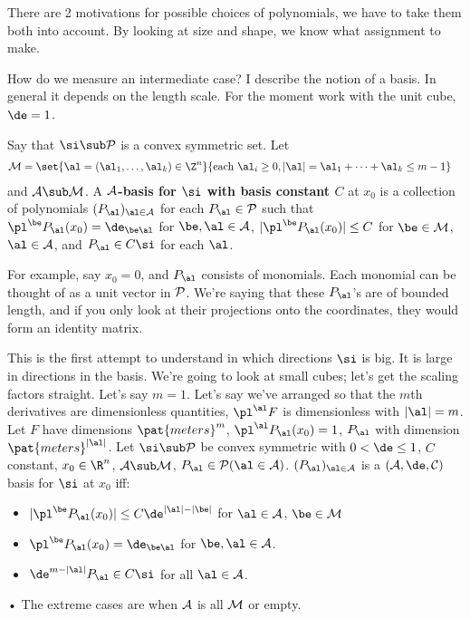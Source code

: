 There are 2 motivations for possible choices of polynomials, we have to take them both into account. By looking at size and shape, we know what assignment to make.

How do we measure an intermediate case? I describe the notion of a basis. In general it depends on the length scale. For the moment work with the unit cube, $\de=1$. 
\begin{df}
Say that $\si\sub \cal P$ is a convex symmetric set. Let
\begin{align}
\cal M&=\set{\al=(\al_1,\ldots, \al_k)\in \Z^n}{\text{each }\al_i\ge 0, |\al|=\al_1+\cdots +\al_k\le m-1}
\end{align}
and $\cal A\sub \cal M$. %
A \textbf{$\cal A$-basis for $\si$ with basis constant $C$} at $x_0$ is a collection of polynomials $(P_\al)_{\al\in \cal A}$ for each $P_\al\in \cal P$ such that $\pl^\be P_\al(x_0) = \de_{\be \al}$ for $\be,\al\in \cal A$, $|\pl^\be P_\al(x_0)|\le C$ for $\be\in \cal M$, $\al\in \cal A$, and $P_\al\in C\si$ for each $\al$. 
\end{df}
For example, say $x_0=0$, and $P_\al$ consists of monomials. Each monomial can be thought of as a unit vector in $\cal P$. We're saying that these $P_\al$'s are of bounded length, and if you only look at their projections onto the coordinates, they would form an identity matrix.

This is the first attempt to understand in which directions $\si$ is big. It is large in directions in the basis.
We're going to look at small cubes; let's get the scaling factors straight. Let's say $m=1$. Let's say we've arranged so that the $m$th derivatives are dimensionless quantities, $\pl^\al F$ is dimensionless with $|\al|=m$. Let $F$ have dimensions $\pat{meters}^m$, $\pl^\al P_\al(x_0)=1$, $P_\al$ with dimension $\pat{meters}^{|\al|}$. 
Let $\si\sub \cal P$ be convex symmetric with $0<\de\le 1$, $C$ constant, $x_0\in \R^n$, $\cal A\sub \cal M$, $P_\al\in \cal P(\al\in \cal A)$. 
$(P_\al)_{\al \in \cal A}$ is a $(\cal A, \de, C)$ basis  for $\si$ at $x_0$ iff:
\begin{itemize}
\item
$|\pl^\be P_\al(x_0)|\le C\de^{|\al|-|\be|}$ for $\al\in \cal A$, $\be\in \cal M$
\item
$\pl^\be P_\al(x_0)=\de_{\be\al}$ for $\be,\al\in \cal A$. 
\item
$\de^{m-|\al|}P_\al\in C\si$ for all $\al \in \cal A$. 
\end{itemize}•
The extreme cases are when $\cal A$ is all $\cal M$ or empty.

